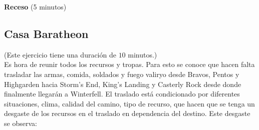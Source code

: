 \documentclass[a4paper,10pt,twocolumn]{article}
\theoremstyle{theorem}
\theoremstyle{definition}
\theoremstyle{remark}
\begin{document}
\textbf{Receso} (5 minutos)

	\subsection{Casa Baratheon}\label{subsec:ejer_4}
(Este ejercicio tiene una duración de $10$ minutos.)\\

Es hora de reunir todos los recursos y tropas. Para esto se conoce que hacen falta trasladar las armas, comida, soldados y fuego valiryo desde Bravos, Pentos y Highgarden hacia Storm's End, King's Landing y Casterly Rock desde donde finalmente llegarán a Winterfell. El traslado está condicionado por diferentes situaciones, clima, calidad del camino, tipo de recurso, que hacen que se tenga un desgaste de los recursos en el traslado en dependencia del destino. Este desgaste se observa:
\end{document}
